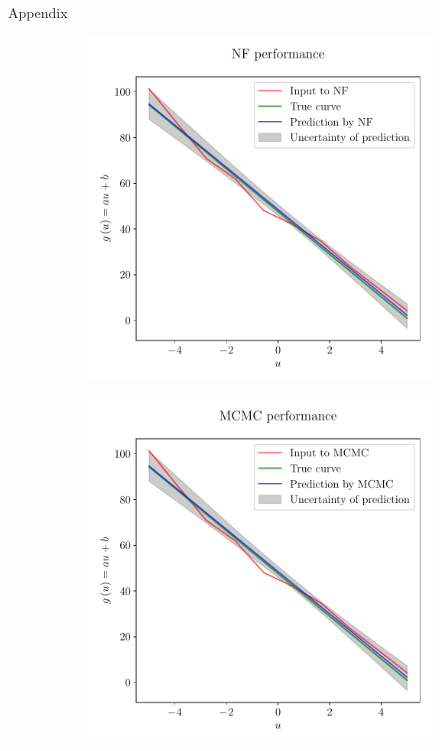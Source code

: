 \documentclass{beamer}
\begin{document}
\begin{frame}[allowframebreaks]{Appendix}
	\begin{figure}[h!]
		\centering
		\begin{subfigure}[t]{0.49\textwidth}
			\centering
			\includegraphics[width=\textwidth]{figures/thesis/nf-linear-regression-example-nfperformance.pdf}
		\end{subfigure}
		\hfill
		\begin{subfigure}[t]{0.49\textwidth}
			\centering
			\includegraphics[width=\textwidth]{figures/thesis/nf-linear-regression-example-mcmcperformance.pdf}

\end{subfigure}
\end{figure}
\end{frame}
\end{document}
